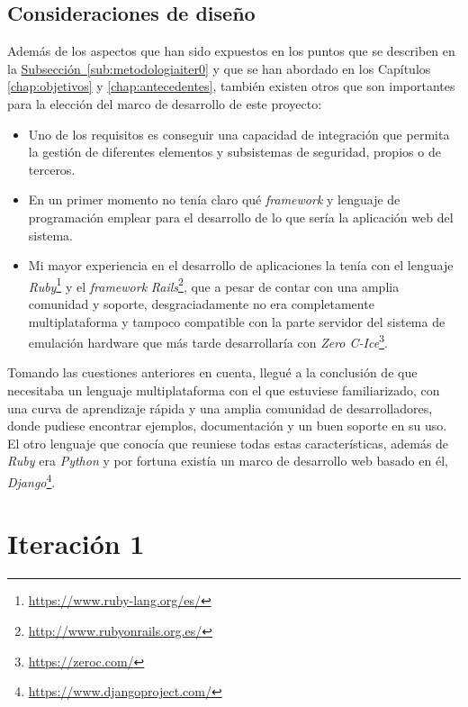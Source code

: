 \subsection{Consideraciones de diseño}

Además de los aspectos que han sido expuestos en los puntos que se describen en la \hyperref[sub:metodologiaiter0]{Subsección~\ref{sub:metodologiaiter0}} y que se han abordado en los Capítulos \hyperref[chap:objetivos]{\ref{chap:objetivos}} y \hyperref[chap:antecedentes]{\ref{chap:antecedentes}}, también existen otros que son importantes para la elección del marco de desarrollo de este proyecto:

\begin{itemize}
  \item Uno de los requisitos es conseguir una capacidad de integración que permita la gestión de diferentes elementos y subsistemas de seguridad, propios o de terceros.
  \item En un primer momento no tenía claro qué \textit{framework} y lenguaje de programación emplear para el desarrollo de lo que sería la aplicación web del sistema.
  \item Mi mayor experiencia en el desarrollo de aplicaciones la tenía con el lenguaje \textit{Ruby}\footnote{\url{https://www.ruby-lang.org/es/}} y el \textit{framework} \textit{Rails}\footnote{\url{http://www.rubyonrails.org.es/}}, que a pesar de contar con una amplia comunidad y soporte, desgraciadamente no era completamente multiplataforma y tampoco compatible con la parte servidor  del sistema de emulación hardware que más tarde desarrollaría con \textit{Zero C-Ice}\footnote{\url{https://zeroc.com/}}.

\end{itemize}

Tomando las cuestiones anteriores en cuenta, llegué a la conclusión de que necesitaba un lenguaje multiplataforma con el que estuviese familiarizado, con una curva de aprendizaje rápida y una amplia comunidad de desarrolladores, donde pudiese encontrar ejemplos, documentación y un buen soporte en su uso. El otro lenguaje que conocía que reuniese todas estas características, además de \textit{Ruby} era \textit{Python} y por fortuna existía un marco de desarrollo web basado en él, \textit{Django}\footnote{\url{https://www.djangoproject.com/}}.

\section{Iteración 1}


